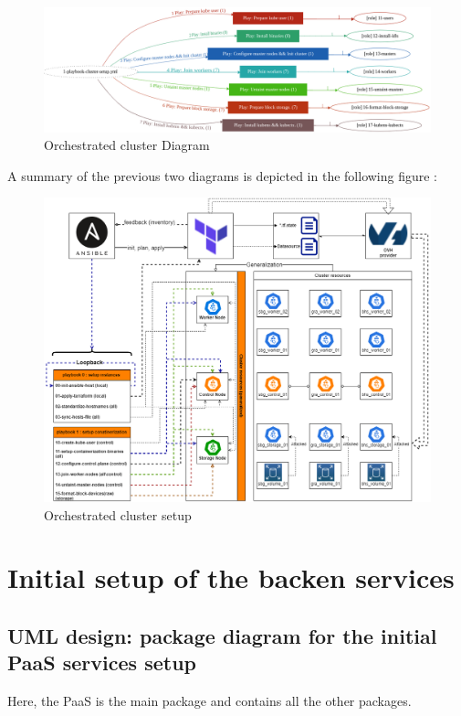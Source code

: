 \begin{figure}[H]\centering
\includegraphics[width=1.0\textwidth,angle=00]{assets/f18.png}
\caption{Orchestrated cluster Diagram}
\label{fig:fig18}
\end{figure}

A summary of the previous two diagrams is depicted in the following figure :

\begin{figure}[H]\centering
\includegraphics[width=1.0\textwidth,angle=00]{assets/f19.png}
\caption{Orchestrated cluster setup}
\label{fig:Orchestrated cluster setup}
\end{figure}
\section{Initial setup of the backen services }
\subsection{UML design: package diagram for the initial PaaS services setup}

Here, the PaaS is the main package and contains all the other packages.

